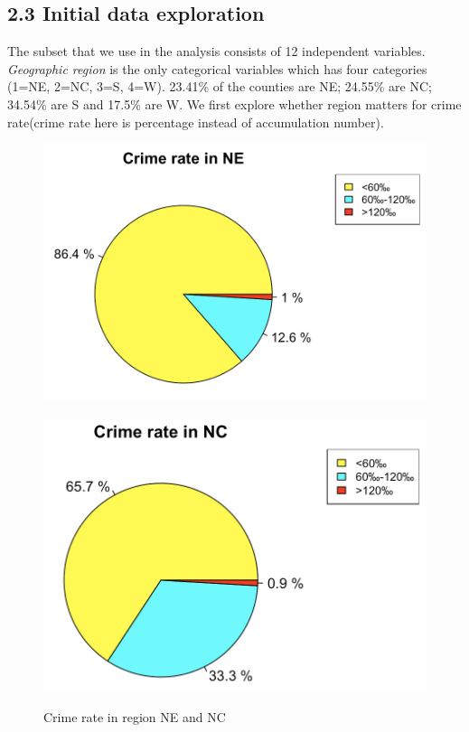 \documentclass[oneside,11pt]{homework}
\begin{document}
\subsection*{2.3 Initial data exploration}
The subset that we use in the analysis consists of 12 independent variables. \textit{Geographic region} is the only categorical variables which has four categories (1=NE, 2=NC, 3=S, 4=W). 23.41\% of the counties are NE; 24.55\% are NC; 34.54\% are S and 17.5\% are W. We first explore whether region matters for crime rate(crime rate here is percentage instead of accumulation number).\par
\begin{figure}[H]
\centering
\includegraphics[scale=0.35]{NE.png}~~~~~
\includegraphics[scale=0.35]{NC.png}
\caption{Crime rate in region NE and NC} 
\end{figure}
\end{document}
